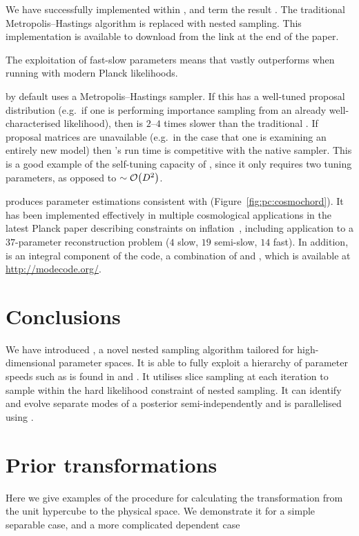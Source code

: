 We have successfully implemented \PolyChord{} within \CosmoMC{}, and term the result \CosmoChord{}.  The traditional Metropolis--Hastings algorithm is replaced with nested sampling. This implementation is available to download from the link at the end of the paper.

The exploitation of fast-slow parameters means that \CosmoChord{} vastly outperforms \MultiNest{} when running with modern Planck likelihoods. 

\CosmoMC{} by default uses a Metropolis--Hastings sampler. If this has a well-tuned proposal distribution (e.g.\ if one is performing importance sampling from an already well-characterised likelihood), then \PolyChord{} is $2$--$4$ times slower than the traditional \CosmoMC{}. If proposal matrices are unavailable (e.g.\ in the case that one is examining an entirely new model) then \CosmoChord{}'s run time is competitive with the native \CosmoMC{} sampler. This is a good example of the self-tuning capacity of \PolyChord{}, since it only requires two tuning parameters, as opposed to ${\sim\mathcal{O}{\left(D^2\right)}}$.

\CosmoChord{} produces parameter estimations consistent with \CosmoMC{} (Figure~\ref{fig:pc:cosmochord}).
It has been implemented effectively in multiple cosmological applications in the latest Planck paper describing constraints on inflation~\citep{planck2015-a24}, including application to a $37$-parameter reconstruction problem ($4$ slow, $19$ semi-slow, $14$ fast). 
In addition, \PolyChord{} is an integral component of the \ModeChord{} code, a combination of \CosmoChord{} and \ModeCode{} \citep{ModeChord1,ModeChord2,ModeChord3}, which is available at \url{http://modecode.org/}.

\section{Conclusions}
\label{sec:pc:conclusions}
We have introduced \PolyChord{}, a novel nested sampling algorithm tailored for high-dimensional parameter spaces. It is able to fully exploit a hierarchy of parameter speeds such as is found in \CosmoMC{} and \CAMB{}. It utilises slice sampling at each iteration to sample within the hard likelihood constraint of nested sampling. It can identify and evolve separate modes of a posterior semi-independently and is parallelised using \openMPI{}.






\section{Prior transformations}
\label{sec:pc:prior_tranformations}
Here we give examples of the procedure for calculating the transformation from the unit hypercube to the physical space. We demonstrate it for a simple separable case, and a more complicated dependent case

